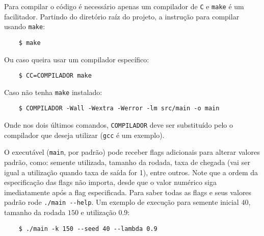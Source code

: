 \documentclass[a4paper]{article}
\newcommand{\inlcode}{\texttt}
\newcommand{\lang}{\texttt}
\begin{document}
Para compilar o código é necessário apenas
um compilador de \lang{C}
e \inlcode{make} é um facilitador.
Partindo do diretório raíz do projeto,
a instrução para compilar usando \inlcode{make}:
\begin{verbatim}
    $ make
\end{verbatim}
Ou caso queira usar um compilador específico:
\begin{verbatim}
    $ CC=COMPILADOR make
\end{verbatim}
Caso não tenha \inlcode{make} instalado:
\begin{verbatim}
    $ COMPILADOR -Wall -Wextra -Werror -lm src/main -o main
\end{verbatim}
Onde nos dois últimos comandos,
\verb.COMPILADOR. deve ser substituído
pelo o compilador que deseja utilizar
(\inlcode{gcc} é um exemplo).

O executável (\inlcode{main}, por padrão)
pode receber flags adicionais para alterar valores padrão,
como: semente utilizada, tamanho da rodada,
taxa de chegada
(vai ser igual a utilização quando taxa de saída for 1),
entre outros.
Note que a ordem da especificação das flags não importa,
desde que o valor numérico siga imediatamente após
a flag especificada.
Para saber todas as flags e seus valores padrão
rode \inlcode{./main -{}-help}.
Um exemplo de execução para semente inicial \(40\),
tamanho da rodada \(150\) e utilização \(0.9\):
\begin{verbatim}
    $ ./main -k 150 --seed 40 --lambda 0.9
\end{verbatim}
\end{document}
